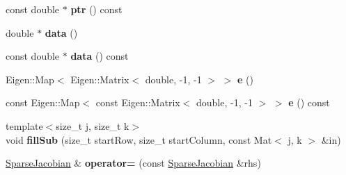 \begin{DoxyCompactItemize}
\mbox{\label{classraisim_1_1SparseJacobian_a6949e5042aaf0b875603f29bc6f144c2}} 
const double $\ast$ {\bfseries ptr} () const
\item 
\mbox{\label{classraisim_1_1SparseJacobian_a22ee51aff38c077322393911d58b5e40}} 
double $\ast$ {\bfseries data} ()
\item 
\mbox{\label{classraisim_1_1SparseJacobian_a489d210f4e8b51ae0e217b6add3ec6fd}} 
const double $\ast$ {\bfseries data} () const
\item 
\mbox{\label{classraisim_1_1SparseJacobian_ae3471df2474822182f1a992eed46ee53}} 
Eigen\+::\+Map$<$ Eigen\+::\+Matrix$<$ double, -\/1, -\/1 $>$ $>$ {\bfseries e} ()
\item 
\mbox{\label{classraisim_1_1SparseJacobian_ad1fe844e177822ae5eebe46ca2842db7}} 
const Eigen\+::\+Map$<$ const Eigen\+::\+Matrix$<$ double, -\/1, -\/1 $>$ $>$ {\bfseries e} () const
\item 
\mbox{\label{classraisim_1_1SparseJacobian_a44314182291a84a7bd986ba5350ba362}} 
{\footnotesize template$<$size\+\_\+t j, size\+\_\+t k$>$ }\\void {\bfseries fill\+Sub} (size\+\_\+t start\+Row, size\+\_\+t start\+Column, const Mat$<$ j, k $>$ \&in)
\item 
\mbox{\label{classraisim_1_1SparseJacobian_a8a51a91462e38b4d82508e386de6e5e9}} 
\hyperlink{classraisim_1_1SparseJacobian}{Sparse\+Jacobian} \& {\bfseries operator=} (const \hyperlink{classraisim_1_1SparseJacobian}{Sparse\+Jacobian} \&rhs)
\end{DoxyCompactItemize}

